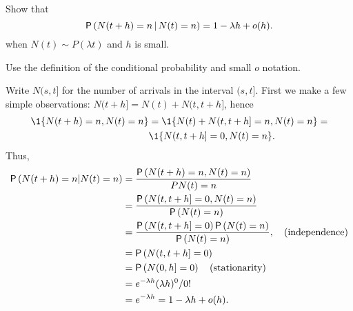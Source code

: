 \begin{exercise}\label{ex:35}
  Show that 
  \begin{equation*}
\P{N(t+h) = n \given N(t) = n} = 1-\lambda h + o(h).
  \end{equation*}
when $N(t) \sim P(\lambda t)$  and $h$ is small. 
    \begin{hint}
Use  the definition of the conditional probability and small $o$ notation.

    \end{hint}
\begin{solution}
Write $N(s, t]$ for the number of arrivals in the interval $(s,t]$. First we make a few simple observations: $N(t+h]= N(t) + N(t, t+h]$, hence
\begin{equation*}
  \begin{split}
  \1{N(t+h)=n, N(t)=n}
&=  \1{N(t) + N(t, t+h] = n, N(t)=n} = \\
&\1{N(t, t+h] = 0, N(t)=n}.
  \end{split}
\end{equation*}
Thus, 
    \begin{align*}
  \P{N(t+h) = n | N(t) = n} 
&=  \frac{\P{N(t+h) = n, N(t) = n}}{P{N(t)=n}} \\
&=  \frac{\P{N(t, t+h] = 0,  N(t) = n}}{\P{N(t)=n}} \\
&=  \frac{\P{N(t, t+h] = 0} \P{N(t) = n}}{\P{N(t)=n}}, \quad \text{(independence)}\\
&= \P{N(t, t+h] = 0} \\
&= \P{N(0, h] = 0} \quad\text{(stationarity)} \\
&= e^{-\lambda h} (\lambda h)^0/0! \\
&= e^{-\lambda h} = 1-\lambda h + o(h).
    \end{align*}
\end{solution}
\end{exercise}

